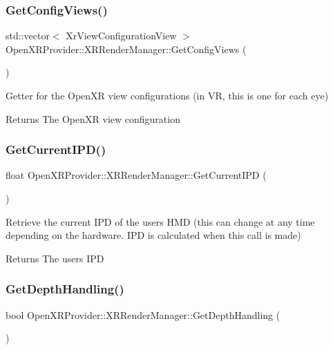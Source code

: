 \subsubsection{\texorpdfstring{GetConfigViews()}{GetConfigViews()}}
{\footnotesize\ttfamily std\+::vector$<$ Xr\+View\+Configuration\+View $>$ Open\+X\+R\+Provider\+::\+X\+R\+Render\+Manager\+::\+Get\+Config\+Views (\begin{DoxyParamCaption}{ }\end{DoxyParamCaption})\hspace{0.3cm}{\ttfamily [inline]}}

Getter for the Open\+XR view configurations (in VR, this is one for each eye) \begin{DoxyReturn}{Returns}
The Open\+XR view configuration 
\end{DoxyReturn}
\mbox{\label{class_open_x_r_provider_1_1_x_r_render_manager_abcef1310df0483107fbbb00dd41ff546}} 
\subsubsection{\texorpdfstring{GetCurrentIPD()}{GetCurrentIPD()}}
{\footnotesize\ttfamily float Open\+X\+R\+Provider\+::\+X\+R\+Render\+Manager\+::\+Get\+Current\+I\+PD (\begin{DoxyParamCaption}{ }\end{DoxyParamCaption})}

Retrieve the current I\+PD of the user\textquotesingle{}s H\+MD (this can change at any time depending on the hardware. I\+PD is calculated when this call is made) \begin{DoxyReturn}{Returns}
The user\textquotesingle{}s I\+PD 
\end{DoxyReturn}
\mbox{\label{class_open_x_r_provider_1_1_x_r_render_manager_af9c80d37753ba2ae24fe2f1aca91ebd0}} 
\subsubsection{\texorpdfstring{GetDepthHandling()}{GetDepthHandling()}}
{\footnotesize\ttfamily bool Open\+X\+R\+Provider\+::\+X\+R\+Render\+Manager\+::\+Get\+Depth\+Handling (\begin{DoxyParamCaption}{ }\end{DoxyParamCaption})\hspace{0.3cm}{\ttfamily [inline]}}

